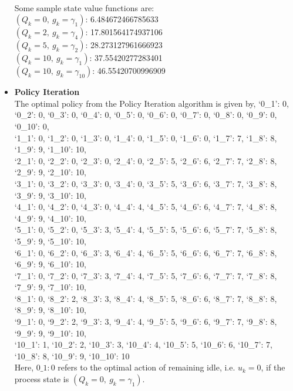 \documentclass[12pt, draftcls, onecolumn]{IEEEtran}
\begin{document}
\begin{itemize}
        \\Some sample state value functions are:
        \\$(Q_k=0,\ g_k=\gamma_{1})$: 6.484672466785633
        \\$(Q_k=2,\ g_k=\gamma_{4})$: 17.801564174937106
        \\$(Q_k=5,\ g_k=\gamma_{2})$: 28.273127961666923
        \\$(Q_k=10,\ g_k=\gamma_{1})$: 37.55420277283401
        \\$(Q_k=10,\ g_k=\gamma_{10})$: 46.55420700996909
        \clearpage
    \item \textbf{Policy Iteration}
        \\The optimal policy from the Policy Iteration algorithm is given by,\newline
        \begingroup
            \fontsize{10pt}{10pt}\selectfont
            {`0\_1': 0, `0\_2': 0, `0\_3': 0, `0\_4': 0, `0\_5': 0, `0\_6': 0, `0\_7': 0, `0\_8': 0, `0\_9': 0, `0\_10': 0,\\ `1\_1': 0, `1\_2': 0, `1\_3': 0, `1\_4': 0, `1\_5': 0, `1\_6': 0, `1\_7': 7, `1\_8': 8, `1\_9': 9, `1\_10': 10,\\ `2\_1': 0, `2\_2': 0, `2\_3': 0, `2\_4': 0, `2\_5': 5, `2\_6': 6, `2\_7': 7, `2\_8': 8, `2\_9': 9, `2\_10': 10,\\ `3\_1': 0, `3\_2': 0, `3\_3': 0, `3\_4': 0, `3\_5': 5, `3\_6': 6, `3\_7': 7, `3\_8': 8, `3\_9': 9, `3\_10': 10,\\ `4\_1': 0, `4\_2': 0, `4\_3': 0, `4\_4': 4, `4\_5': 5, `4\_6': 6, `4\_7': 7, `4\_8': 8, `4\_9': 9, `4\_10': 10,\\ `5\_1': 0, `5\_2': 0, `5\_3': 3, `5\_4': 4, `5\_5': 5, `5\_6': 6, `5\_7': 7, `5\_8': 8, `5\_9': 9, `5\_10': 10,\\ `6\_1': 0, `6\_2': 0, `6\_3': 3, `6\_4': 4, `6\_5': 5, `6\_6': 6, `6\_7': 7, `6\_8': 8, `6\_9': 9, `6\_10': 10,\\ `7\_1': 0, `7\_2': 0, `7\_3': 3, `7\_4': 4, `7\_5': 5, `7\_6': 6, `7\_7': 7, `7\_8': 8, `7\_9': 9, `7\_10': 10,\\ `8\_1': 0, `8\_2': 2, `8\_3': 3, `8\_4': 4, `8\_5': 5, `8\_6': 6, `8\_7': 7, `8\_8': 8, `8\_9': 9, `8\_10': 10,\\ `9\_1': 0, `9\_2': 2, `9\_3': 3, `9\_4': 4, `9\_5': 5, `9\_6': 6, `9\_7': 7, `9\_8': 8, `9\_9': 9, `9\_10': 10,\\ `10\_1': 1, `10\_2': 2, `10\_3': 3, `10\_4': 4, `10\_5': 5, `10\_6': 6, `10\_7': 7, `10\_8': 8, `10\_9': 9, `10\_10': 10}
        \endgroup
        \\Here, $0\_1: 0$ refers to the optimal action of remaining idle, i.e. $u_k=0$, if the process state is $(Q_k=0,\ g_k=\gamma_1)$.

\end{itemize}
\end{document}
